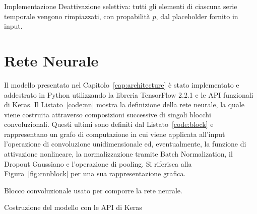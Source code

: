 \begin{listing}[htp]
  \caption{Implementazione Deattivazione selettiva: tutti gli elementi di
    ciascuna serie temporale vengono rimpiazzati, con propabilità \(p\), dal
    placeholder fornito in input.}
\end{listing}

\section{Rete Neurale}
Il modello presentato nel Capitolo~\ref{cap:architecture} è stato implementato
e addestrato in Python utilizzando la libreria TensorFlow 2.2.1 e le API
funzionali di Keras. Il Listato~\ref{code:nn} mostra la definizione della rete
neurale, la quale viene costruita attraverso composizioni successive di singoli
blocchi convoluzionali. 
Questi ultimi sono definiti dal
Listato~\ref{code:block} e rappresentano un grafo di computazione in cui viene
applicata all'input l'operazione di convoluzione unidimensionale ed,
eventualmente, la funzione di attivazione nonlineare, la normalizzazione
tramite Batch Normalization, il Dropout Gaussiano e l'operazione di pooling. Si
riferisca alla Figura~\ref{fig:cnnblock} per una sua rappresentazione grafica.
\begin{listing}[htp]
	\caption{Blocco convoluzionale usato per comporre la rete neurale.}
  \label{code:block}
\end{listing}
\begin{listing}[htp]
  \caption{Costruzione del modello con le API di Keras}
  \label{code:nn}
\end{listing}




